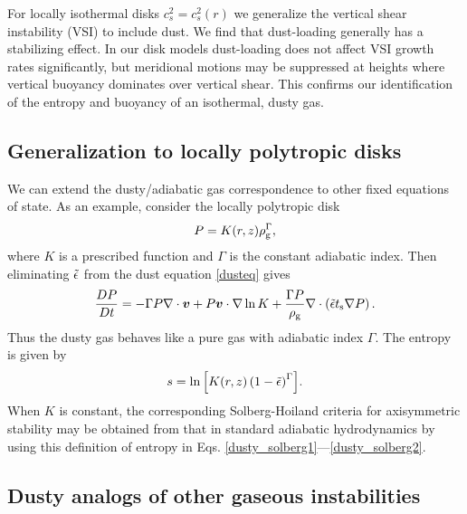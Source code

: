 
For locally isothermal disks $c^2_s=c_s^2(r)$ we generalize the vertical
shear instability (VSI) to include dust. We find that dust-loading
generally has a stabilizing effect. In our disk models
dust-loading does not affect VSI growth rates significantly, but
meridional motions may be suppressed at heights where vertical 
buoyancy dominates over vertical shear. This confirms our 
identification of the entropy and buoyancy of an isothermal, dusty
gas.  


\subsection{Generalization to locally polytropic disks}
We can extend the dusty/adiabatic gas correspondence to 
other fixed equations of state. As an example, consider the locally
polytropic disk 
\begin{align}
  P = K(r,z)\rho_\mathrm{g}^{\Gamma}, 
\end{align}
where $K$ is a prescribed function and $\Gamma$ is the constant
adiabatic index. Then eliminating $\tilde{\epsilon}$ from the dust equation
\ref{dusteq} gives 
\begin{align}
  \frac{D P}{D t} = - \Gamma P\nabla\cdot\bm{v}  + P \bm{v}\cdot\nabla \ln{K}
  + \frac{\Gamma P}{\rho_\mathrm{g}}\nabla\cdot\left(\tilde{\epsilon}t_\mathrm{s}\nabla
  P\right).
\end{align}
Thus the dusty gas behaves like a pure gas with adiabatic index
$\Gamma$. The entropy is given by 
\begin{align}
  s = \ln{\left[K(r,z)\left(1 - \tilde{\epsilon}\right)^\Gamma\right]}.  
\end{align}
When $K$ is constant, the corresponding Solberg-Hoiland criteria for
axisymmetric stability may be obtained from that in standard adiabatic 
hydrodynamics \citep[e.g.][]{tassoul78} by
using this definition of entropy in
Eqs. \ref{dusty_solberg1}---\ref{dusty_solberg2}. 

\subsection{Dusty analogs of other gaseous instabilities}  

